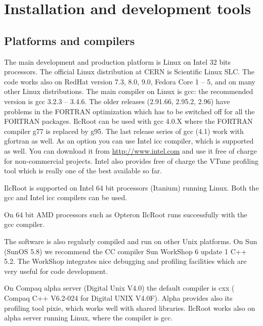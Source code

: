 \documentclass[12pt,a4paper,twoside]{article}
\begin{document}

\newpage 
\section{Installation and development tools}\label{Installation}


\subsection{Platforms and compilers}

The main development and production platform is Linux on Intel 32 bits
processors.  The official  Linux\cite{Linux} distribution  at  CERN is
Scientific   Linux    SLC\cite{SLC}.   The   code    works   also   on
RedHat\cite{RedHat} version 7.3,  8.0, 9.0, Fedora Core\cite{Fedora} 1
-- 5,  and on  many other  Linux distributions.  The main  compiler on
Linux  is  gcc\cite{gcc}: the  recommended  version  is  gcc 3.2.3  --
3.4.6. The older releases (2.91.66, 2.95.2, 2.96) have problems in the
FORTRAN optimization which has to  be switched off for all the FORTRAN
packages.  IlcRoot  can be  used  with  gcc  4.0.X where  the  FORTRAN
compiler g77 is replaced by g95.  The last release series of gcc (4.1)
work  with  gfortran  as  well.   As  an  option  you  can  use  Intel
icc\cite{icc} compiler,  which is supported as well.  You can download
it  from \url{http://www.intel.com}  and  use it  free  of charge  for
non-commercial  projects.  Intel  also  provides free  of  charge  the
VTune\cite{VTune}  profiling tool  which  is really  one  of the  best
available so far.

IlcRoot    is     supported    on    Intel     64    bit    processors
(Itanium\cite{Itanium})  running Linux.  Both  the gcc  and Intel  icc
compilers can be used.

On  64  bit AMD\cite{AMD}  processors  such  as  Opteron IlcRoot  runs
successfully with the gcc compiler.

The  software  is  also  regularly  compiled and  run  on  other  Unix
platforms.  On  Sun (SunOS  5.8)  we  recommend  the CC  compiler  Sun
WorkShop 6  update 1 C++  5.2. The WorkShop integrates  nice debugging
and profiling facilities which are very useful for code development.

On Compaq alpha server (Digital Unix V4.0) the default compiler is cxx
( Compaq C++ V6.2-024 for Digital UNIX V4.0F). Alpha provides also its
profiling tool pixie, which  works well with shared libraries. IlcRoot
works also on alpha server running Linux, where the compiler is gcc.
\end{document}

